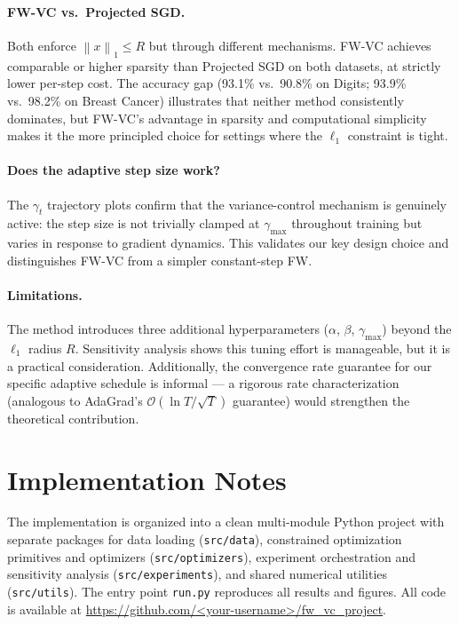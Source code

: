 \documentclass[10pt,twocolumn]{article}
\newcommand{\norm}[1]{\left\|#1\right\|}
\begin{document}
\paragraph{FW-VC vs.\ Projected SGD.}
Both enforce $\norm{x}_1 \leq R$ but through different mechanisms. FW-VC
achieves comparable or higher sparsity than Projected SGD on both
datasets, at strictly lower per-step cost. The accuracy gap (93.1\% vs.\
90.8\% on Digits; 93.9\% vs.\ 98.2\% on Breast Cancer) illustrates that
neither method consistently dominates, but FW-VC's advantage in sparsity
and computational simplicity makes it the more principled choice for
settings where the $\ell_1$ constraint is tight.

\paragraph{Does the adaptive step size work?}
The $\gamma_t$ trajectory plots confirm that the variance-control
mechanism is genuinely active: the step size is not trivially clamped at
$\gamma_{\max}$ throughout training but varies in response to gradient
dynamics. This validates our key design choice and distinguishes FW-VC
from a simpler constant-step FW.

\paragraph{Limitations.}
The method introduces three additional hyperparameters ($\alpha$, $\beta$,
$\gamma_{\max}$) beyond the $\ell_1$ radius $R$. Sensitivity analysis
shows this tuning effort is manageable, but it is a practical
consideration. Additionally, the convergence rate guarantee for our
specific adaptive schedule is informal — a rigorous rate characterization
(analogous to AdaGrad's $\mathcal{O}(\ln T/\sqrt{T})$ guarantee) would
strengthen the theoretical contribution.


\section{Implementation Notes}
\label{sec:impl}

The implementation is organized into a clean multi-module Python project
with separate packages for data loading (\texttt{src/data}), constrained
optimization primitives and optimizers (\texttt{src/optimizers}),
experiment orchestration and sensitivity analysis
(\texttt{src/experiments}), and shared numerical utilities
(\texttt{src/utils}). The entry point \texttt{run.py} reproduces all
results and figures. All code is available at
\url{https://github.com/<your-username>/fw_vc_project}.
\end{document}
